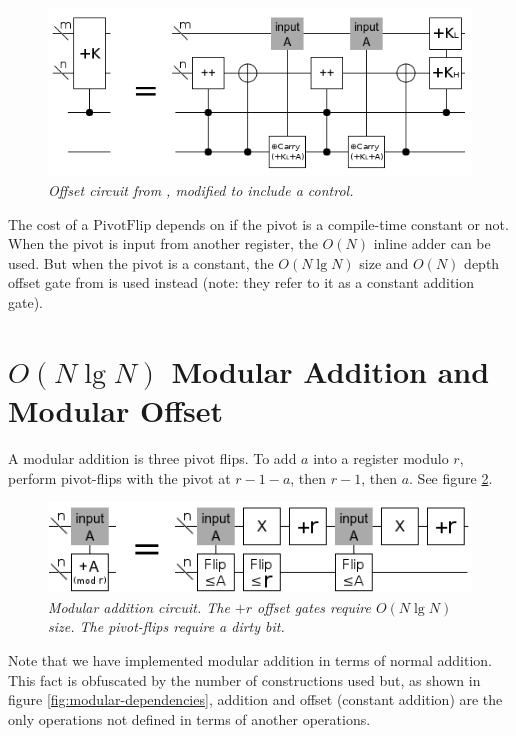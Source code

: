 \documentclass[twocolumn]{article}
\begin{document}
\begin{figure}
  \centering
  \includegraphics[totalheight=3.1cm]{controlled-offset.png}
  \caption{\em Offset circuit from \cite{haner2016}, modified to include a control.}
  \label{fig:controlled-offset}
\end{figure}

The cost of a $\text{PivotFlip}$ depends on if the pivot is a compile-time constant or not.
When the pivot is input from another register, the $O(N)$ inline adder can be used.
But when the pivot is a constant, the $O(N \lg N)$ size and $O(N)$ depth offset gate from \cite{haner2016} is used instead (note: they refer to it as a constant addition gate).

\section{$O(N \lg N)$ Modular Addition and Modular Offset}

A modular addition is three pivot flips.
To add $a$ into a register modulo $r$, perform pivot-flips with the pivot at $r-1-a$, then $r-1$, then $a$.
See figure \ref{fig:modular-add}.

\begin{figure}
  \centering
  \includegraphics[totalheight=1.7cm]{modular-addition.png}
  \caption{\em Modular addition circuit.
  The $+r$ offset gates require $O(N \lg N)$ size.
  The pivot-flips require a dirty bit.}
  \label{fig:modular-add}
\end{figure}

Note that we have implemented modular addition in terms of normal addition.
This fact is obfuscated by the number of constructions used but, as shown in figure \ref{fig:modular-dependencies}, addition and offset (constant addition) are the only operations not defined in terms of another operations.
\end{document}
